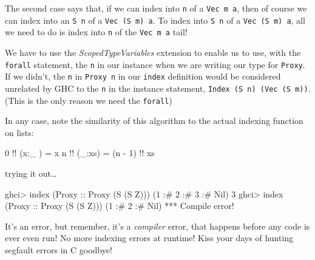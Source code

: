 \documentclass[]{article}
\newenvironment{Shaded}{\begin{snugshade}}{\end{snugshade}}
\newcommand{\DataTypeTok}[1]{\textcolor[rgb]{0.13,0.29,0.53}{#1}}
\newcommand{\DecValTok}[1]{\textcolor[rgb]{0.00,0.00,0.81}{#1}}
\newcommand{\FunctionTok}[1]{\textcolor[rgb]{0.00,0.00,0.00}{#1}}
\newcommand{\NormalTok}[1]{#1}
\newcommand{\OtherTok}[1]{\textcolor[rgb]{0.56,0.35,0.01}{#1}}
\begin{document}
The second case says that, if we can index into \texttt{n} of a
\texttt{Vec\ m\ a}, then of course we can index into an \texttt{S\ n} of a
\texttt{Vec\ (S\ m)\ a}. To index into \texttt{S\ n} of a
\texttt{Vec\ (S\ m)\ a}, all we need to do is index into \texttt{n} of the
\texttt{Vec\ m\ a} tail!

We have to use the \emph{ScopedTypeVariables} extension to enable us to use,
with the \texttt{forall} statement, the \texttt{n} in our instance when we are
writing our type for \texttt{Proxy}. If we didn't, the \texttt{n} in
\texttt{Proxy\ n} in our \texttt{index} definition would be considered unrelated
by GHC to the \texttt{n} in the instance statement,
\texttt{Index\ (S\ n)\ (Vec\ (S\ m))}. (This is the only reason we need the
\texttt{forall})

In any case, note the similarity of this algorithm to the actual indexing
function on lists:

\begin{Shaded}
\begin{Highlighting}[]
\DecValTok{0} \FunctionTok{!!}\NormalTok{ (x}\FunctionTok{:}\NormalTok{_ ) }\FunctionTok{=}\NormalTok{ x}
\NormalTok{n }\FunctionTok{!!}\NormalTok{ (_}\FunctionTok{:}\NormalTok{xs) }\FunctionTok{=}\NormalTok{ (n }\FunctionTok{-} \DecValTok{1}\NormalTok{) }\FunctionTok{!!}\NormalTok{ xs}
\end{Highlighting}
\end{Shaded}

trying it out\ldots{}

\begin{Shaded}
\begin{Highlighting}[]
\NormalTok{ghci}\FunctionTok{>}\NormalTok{ index (}\DataTypeTok{Proxy}\OtherTok{ ::} \DataTypeTok{Proxy}\NormalTok{ (}\DataTypeTok{S}\NormalTok{ (}\DataTypeTok{S} \DataTypeTok{Z}\NormalTok{))) (}\DecValTok{1} \FunctionTok{:#} \DecValTok{2} \FunctionTok{:#} \DecValTok{3} \FunctionTok{:#} \DataTypeTok{Nil}\NormalTok{)}
\DecValTok{3}
\NormalTok{ghci}\FunctionTok{>}\NormalTok{ index (}\DataTypeTok{Proxy}\OtherTok{ ::} \DataTypeTok{Proxy}\NormalTok{ (}\DataTypeTok{S}\NormalTok{ (}\DataTypeTok{S} \DataTypeTok{Z}\NormalTok{))) (}\DecValTok{1} \FunctionTok{:#} \DecValTok{2} \FunctionTok{:#} \DataTypeTok{Nil}\NormalTok{)}
\FunctionTok{***} \DataTypeTok{Compile}\NormalTok{ error}\FunctionTok{!}
\end{Highlighting}
\end{Shaded}

It's an error, but remember, it's a \emph{compiler} error, that happens before
any code is ever even run! No more indexing errors at runtime! Kiss your days of
hunting segfault errors in C goodbye!
\end{document}
